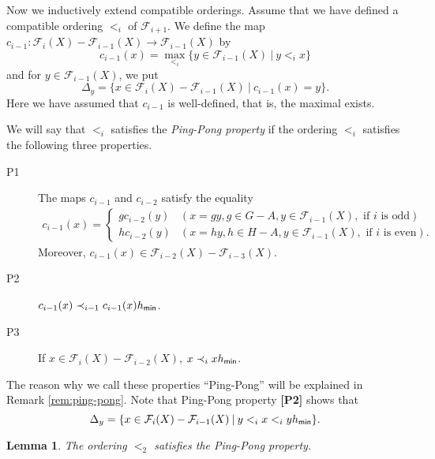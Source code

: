 \documentclass[10pt]{amsart}
\newtheorem{lemma}[theorem]{Lemma}
\numberwithin{equation}{section}
\begin{document}
Now we inductively extend compatible orderings. Assume that we have defined a compatible ordering $<_{i}$ of ${\mathcal{F}}_{i+1}$. We define the map $c_{i-1}:{\mathcal{F}}_{i}(X)-{\mathcal{F}}_{i-1}(X) \rightarrow {\mathcal{F}}_{i-1}(X)$ by
\[ c_{i-1}(x)=\max_{<_{i}} \{y \in {\mathcal{F}}_{i-1}(X) \: | \: y <_{i} x \}\]
 and for $y \in {\mathcal{F}}_{i-1}(X)$, we put 
\[ \Delta_{y} =\{ x \in {\mathcal{F}}_{i}(X)-{\mathcal{F}}_{i-1}(X) \: | \: c_{i-1}(x)=y\}. \]
Here we have assumed that $c_{i-1}$ is well-defined, that is, the maximal exists.

We will say that $<_{i}$ satisfies the \emph{Ping-Pong property} if the ordering $<_{i}$ satisfies the following three properties.

\begin{description}
\item[P1] The maps $c_{i-1}$ and $c_{i-2}$ satisfy the equality
\begin{gather*}
 c_{i-1}(x) = 
\begin{cases}
 gc_{i-2}(y) & (x=gy, g \in G-A, y \in {\mathcal{F}}_{i-1}(X), \text{ if } i \text{ is odd})\\
 hc_{i-2}(y) & (x=hy, h \in H-A, y \in {\mathcal{F}}_{i-1}(X), \text{ if } i \text{ is even}).
\end{cases}
\end{gather*}
Moreover, $c_{i-1}(x) \in {\mathcal{F}}_{i-2}(X)-{\mathcal{F}}_{i-3}(X)$.
\item[P2] $c_{i-1}(x) \prec_{i-1} c_{i-1}(x)h_{\sf min}$.
\item[P3] If $x \in {\mathcal{F}}_{i}(X)-{\mathcal{F}}_{i-2}(X)$, $x \prec_{i} xh_{\sf min}$.
\end{description}

The reason why we call these properties ``Ping-Pong'' will be explained in Remark \ref{rem:ping-pong}. Note that Ping-Pong property {\bf [P2]} shows that
\begin{equation}
\label{eqn:delta} \Delta_{y} =\{ x \in {\mathcal{F}}_{i}(X)-{\mathcal{F}}_{i-1}(X) \: | \: y <_{i} x <_{i} yh_{\sf min}\}. 
\end{equation}
 

\begin{lemma}
The ordering $<_2$ satisfies the Ping-Pong property.
\end{lemma}
\end{document}
